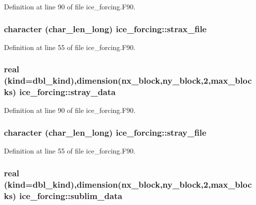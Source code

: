 Definition at line 90 of file ice\_\-forcing.F90.\hypertarget{namespaceice__forcing_a49c9fbd4c57cb5e160f88fd18db10938}{
\subsubsection[{strax\_\-file}]{\setlength{\rightskip}{0pt plus 5cm}character (char\_\-len\_\-long) {\bf ice\_\-forcing::strax\_\-file}}}
\label{namespaceice__forcing_a49c9fbd4c57cb5e160f88fd18db10938}


Definition at line 55 of file ice\_\-forcing.F90.\hypertarget{namespaceice__forcing_af5d69277a6de176e90f0b2329fef928c}{
\subsubsection[{stray\_\-data}]{\setlength{\rightskip}{0pt plus 5cm}real (kind=dbl\_\-kind),dimension(nx\_\-block,ny\_\-block,2,max\_\-blocks) {\bf ice\_\-forcing::stray\_\-data}}}
\label{namespaceice__forcing_af5d69277a6de176e90f0b2329fef928c}


Definition at line 90 of file ice\_\-forcing.F90.\hypertarget{namespaceice__forcing_a5539f8ddd2633d9b318092daf9745cf9}{
\subsubsection[{stray\_\-file}]{\setlength{\rightskip}{0pt plus 5cm}character (char\_\-len\_\-long) {\bf ice\_\-forcing::stray\_\-file}}}
\label{namespaceice__forcing_a5539f8ddd2633d9b318092daf9745cf9}


Definition at line 55 of file ice\_\-forcing.F90.\hypertarget{namespaceice__forcing_aeefce6613d18c1281edaf501aa11ce4a}{
\subsubsection[{sublim\_\-data}]{\setlength{\rightskip}{0pt plus 5cm}real (kind=dbl\_\-kind),dimension(nx\_\-block,ny\_\-block,2,max\_\-blocks) {\bf ice\_\-forcing::sublim\_\-data}}}
\label{namespaceice__forcing_aeefce6613d18c1281edaf501aa11ce4a}


